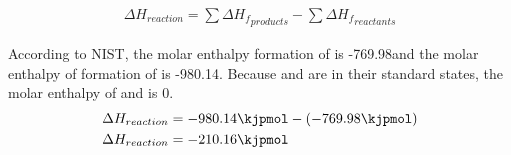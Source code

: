 \documentclass[demo, 12pt, notitlepage, letterpaper]{report}
\begin{document}
\begin{align*}
	\Delta H_{reaction} = \sum \Delta {H_f}_{products} - \sum \Delta {H_f}_{reactants}
\end{align*}

According to NIST, the molar enthalpy formation of  is -769.98\kjpmol and the molar enthalpy of formation of  is -980.14\kjpmol . Because  and  are in their standard states, the molar enthalpy of  and  is 0\kjpmol .
\begin{align*}
	\Delta H_{reaction} & = -980.14\kjpmol - (-769.98\kjpmol) \\
	\Delta H_{reaction} & = -210.16\kjpmol
\end{align*}

\end{document}
